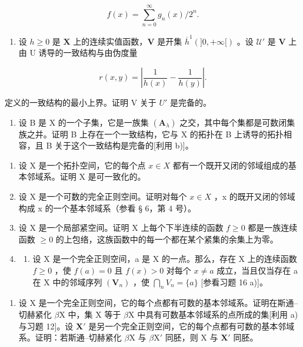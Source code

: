 \[
f (x) = \sum_ {n = 0} ^ {\infty} g _ {n} (x) / 2 ^ {n}.
\]

\begin{enumerate}
\def\labelenumi{\alph{enumi})}
\setcounter{enumi}{1}
\tightlist
\item
  设 \(h \geqslant 0\) 是 \(\mathbf{X}\) 上的连续实值函数，\(\mathbf{V}\) 是开集 \(\overline{h}^{1}(]0, +\infty[)\) 。设 \(\mathcal{U}'\) 是 \(\mathbf{V}\) 上由 U 诱导的一致结构与由伪度量
\end{enumerate}

\[
r (x, y) = \left| \frac {\mathrm{1}}{h (x)} - \frac {\mathrm{1}}{h (y)} \right|.
\]

定义的一致结构的最小上界。证明 V 关于 \(U'\) 是完备的。

\begin{enumerate}
\def\labelenumi{\alph{enumi})}
\setcounter{enumi}{2}
\tightlist
\item
  设 B 是 X 的一个子集，它是一族集 \((\mathbf{A}_{\lambda})\) 之交，其中每个集都是可数闭集族之并。证明 B 上存在一个一致结构，它与 X 的拓扑在 B 上诱导的拓扑相容，且 B 关于这个一致结构是完备的{[}利用 b){]}。
\end{enumerate}

\begin{enumerate}
\def\labelenumi{\arabic{enumi})}
\setcounter{enumi}{16}
\item
  设 X 是一个拓扑空间，它的每个点 \(x \in X\) 都有一个既开又闭的邻域组成的基本邻域系。证明 X 是可一致化的。
\item
  设 X 是一个可数的完全正则空间。证明对每个 \(x \in X\) ，x 的既开又闭的邻域构成 x 的一个基本邻域系（参看 § 6，第 4 号）。
\item
  设 X 是一个局部紧空间。证明 X 上每个下半连续的函数 \(f \geqslant 0\) 都是一族连续函数 \(\geqslant 0\) 的上包络，这族函数中的每一个都在某个紧集的余集上为零。
\item
  \begin{enumerate}
  \def\labelenumii{\alph{enumii})}
  \tightlist
  \item
    设 X 是一个完全正则空间，a 是 X 的一点。那么，存在 X 上的连续函数 \(f \geqslant 0\) ，使 \(f(a) = 0\) 且 \(f(x) > 0\) 对每个 \(x \neq a\) 成立，当且仅当存在 a 在 X 中的邻域序列 \((\mathbf{V}_n)\) ，使 \(\bigcap_{n} V_n = \{a\}\) {[}参看习题 16 a){]}。
  \end{enumerate}
\end{enumerate}

\begin{enumerate}
\def\labelenumi{\alph{enumi})}
\setcounter{enumi}{1}
\tightlist
\item
  设 X 是一个完全正则空间，它的每个点都有可数的基本邻域系。证明在斯通–切赫紧化 \(\beta\mathrm{X}\) 中，集 X 等于 \(\beta\mathrm{X}\) 中具有可数基本邻域系的点所成的集{[}利用 a) 与习题 12{]}。设 \(\mathbf{X}'\) 是另一个完全正则空间，它的每个点都有可数的基本邻域系。证明：若斯通–切赫紧化 \(\beta\mathrm{X}\) 与 \(\beta\mathrm{X}'\) 同胚，则 X 与 \(\mathbf{X}'\) 同胚。
\end{enumerate}

